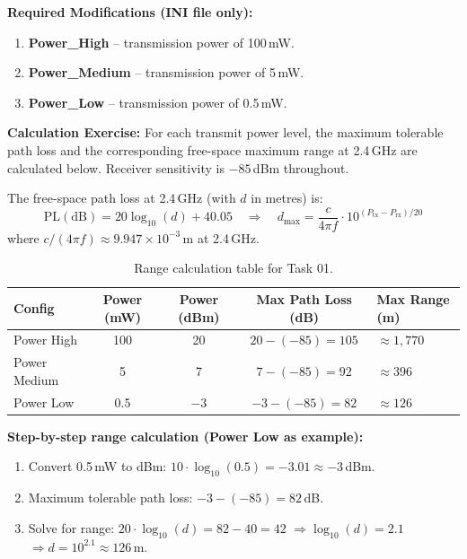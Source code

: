 \documentclass[12pt]{article}
\begin{document}
\textbf{Required Modifications (INI file only):}
\begin{enumerate}
    \item \textbf{Power\_High} -- transmission power of 100\,mW.
    \item \textbf{Power\_Medium} -- transmission power of 5\,mW.
    \item \textbf{Power\_Low} -- transmission power of 0.5\,mW.
\end{enumerate}

\textbf{Calculation Exercise:} For each transmit power level, the maximum tolerable
path loss and the corresponding free-space maximum range at 2.4\,GHz are calculated
below. Receiver sensitivity is $-85$\,dBm throughout.

The free-space path loss at 2.4\,GHz (with $d$ in metres) is:
\[
  \mathrm{PL}(\mathrm{dB}) = 20\log_{10}(d) + 40.05
  \quad \Longrightarrow \quad
  d_{\max} = \frac{c}{4\pi f}\cdot 10^{(P_{\mathrm{tx}}-P_{\mathrm{rx}})/20}
\]
where $c/(4\pi f) \approx 9.947 \times 10^{-3}$\,m at 2.4\,GHz.

\begin{table}[H]
    \centering
    \small
    \renewcommand{\arraystretch}{1.15}
    \begin{tabularx}{\linewidth}{|l|c|c|c|X|}
        \hline
        \textbf{Config} & \textbf{Power (mW)} & \textbf{Power (dBm)}
            & \textbf{Max Path Loss (dB)} & \textbf{Max Range (m)} \\
        \hline
        Power High   & 100  & 20   & $20-(-85) = 105$ & $\approx 1{,}770$ \\
        \hline
        Power Medium &   5  &  7   & $7-(-85) = 92$   & $\approx 396$   \\
        \hline
        Power Low    & 0.5  & $-3$ & $-3-(-85) = 82$  & $\approx 126$   \\
        \hline
    \end{tabularx}
    \caption{Range calculation table for Task 01.}
    \label{tab:task1_range}
\end{table}

\textbf{Step-by-step range calculation (Power Low as example):}
\begin{enumerate}
    \item Convert 0.5\,mW to dBm:
          $10\cdot\log_{10}(0.5) = -3.01 \approx -3$\,dBm.
    \item Maximum tolerable path loss:
          $-3 - (-85) = 82$\,dB.
    \item Solve for range:
          $20\cdot\log_{10}(d) = 82 - 40 = 42$
          $\Rightarrow \log_{10}(d) = 2.1$
          $\Rightarrow d = 10^{2.1} \approx 126$\,m.
\end{enumerate}
\end{document}

